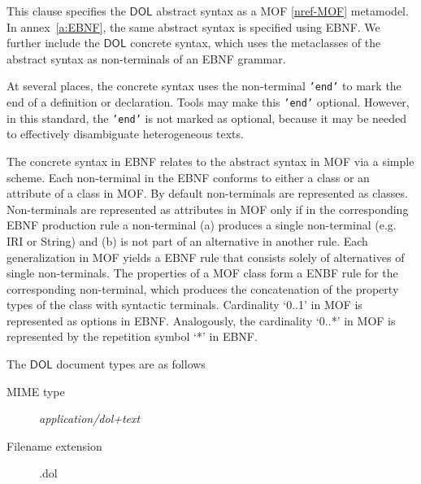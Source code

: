 \documentclass[10pt, a4paper]{isov2}
\newcommand*{\mimetype}[1]{\textit{#1}}
\newcommand*{\syntax}[1]{\texttt{#1}}
\newcommand*{\DOL}{\ensuremath{\mathsf{DOL}}\xspace}
\renewcommand{\noterefname}{note}
\renewcommand{\nref}[1]{\noterefname~\ref{#1}}
\renewcommand{\nref}[1]{\ref{nref-#1}}
\begin{document}
\cleardoublepage
\clause{\DOL  Syntax}\label{c:abstract-syntax}%

This clause specifies the \DOL abstract syntax as a MOF \nref{MOF} metamodel.
In annex~\ref{a:EBNF}, the same abstract syntax is specified using EBNF.
We further include  the \DOL concrete syntax, which
uses the metaclasses of the abstract syntax as non-terminals of
an EBNF grammar.


At several places, the concrete syntax uses the non-terminal
\syntax{'end'} to mark the end of a definition or declaration. Tools
may make this \syntax{'end'} optional. However, in this standard,
the \syntax{'end'} is not marked as optional, because it may be needed to effectively
disambiguate heterogeneous texts.

The concrete syntax in EBNF relates to the abstract syntax in MOF via a simple scheme. Each 
 non-terminal in the EBNF conforms to either a class or an attribute of a class in MOF.
By default non-terminals are represented as classes. Non-terminals are represented as attributes in MOF 
only if in the corresponding EBNF production rule a non-terminal (a) produces 
a single non-terminal  (e.g. IRI or String) and  
(b) is  not part of an alternative in another rule. 
Each generalization in MOF yields a EBNF rule that 
consists solely of alternatives of single non-terminals. 
The properties of a MOF class form a ENBF rule for the corresponding non-terminal, 
which produces the concatenation of the property types of the class with syntactic terminals.
Cardinality  `0..1' in MOF is  represented as options in EBNF.  Analogously, the cardinality 
`0..*' in MOF is represented by the repetition symbol `*' in EBNF.

\medskip
The \DOL document types are as follows
		 \begin{description} 
			\item[MIME type] \mimetype{application/dol+text}
			\item[Filename extension] .dol
		 \end{description} 


\label{s:mof-metaclasses}
\end{document}
